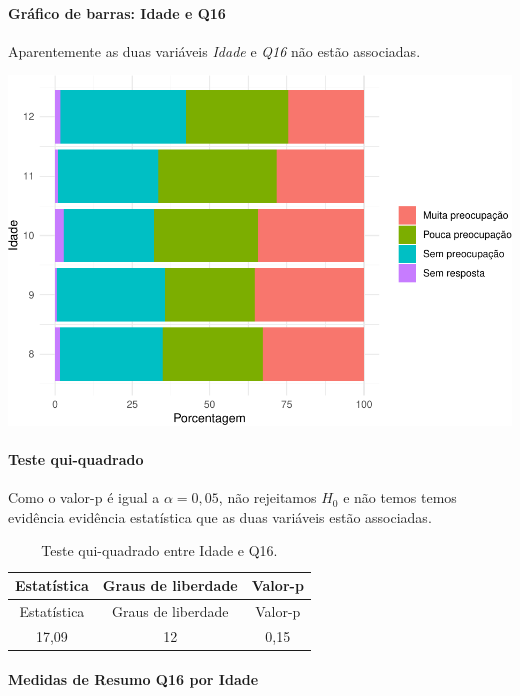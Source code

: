 \documentclass[]{article}
\let\oldparagraph\paragraph
\renewcommand{\paragraph}[1]{\oldparagraph{#1}\mbox{}}
\begin{document}
\hypertarget{gruxe1fico-de-barras-idade-e-q16}{%
\paragraph{Gráfico de barras: Idade e Q16}\label{gruxe1fico-de-barras-idade-e-q16}}

Aparentemente as duas variáveis \emph{Idade} e \emph{Q16} não estão associadas.

\begin{center}\includegraphics[width=0.75\linewidth]{relatorio_files/figure-latex/unnamed-chunk-151-1} \end{center}

\hypertarget{teste-qui-quadrado-14}{%
\paragraph{Teste qui-quadrado}\label{teste-qui-quadrado-14}}

Como o valor-p é igual a \(\alpha=0,05\), não rejeitamos \(H_0\) e não temos temos evidência evidência estatística que as duas variáveis estão associadas.

\begin{longtable}[]{@{}ccc@{}}
\caption{\label{tab:unnamed-chunk-152}Teste qui-quadrado entre Idade e Q16.}\tabularnewline
\toprule
Estatística & Graus de liberdade & Valor-p\tabularnewline
\midrule
\endfirsthead
\toprule
Estatística & Graus de liberdade & Valor-p\tabularnewline
\midrule
\endhead
17,09 & 12 & 0,15\tabularnewline
\bottomrule
\end{longtable}

\cleardoublepage

\hypertarget{medidas-de-resumo-q16-por-idade}{%
\paragraph{Medidas de Resumo Q16 por Idade}\label{medidas-de-resumo-q16-por-idade}}
\end{document}
